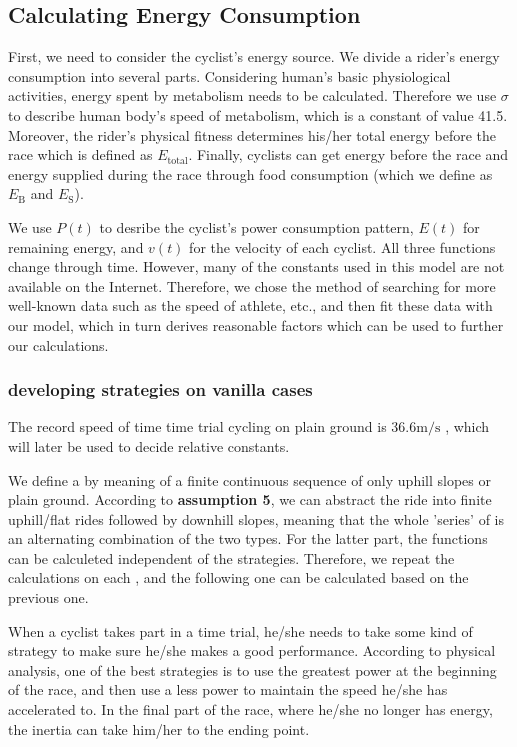 \documentclass{article}
\begin{document}
		\subsection{Calculating Energy Consumption}
			First, we need to consider the cyclist's energy source. We divide a rider's energy consumption into several parts. Considering human's basic physiological activities, energy spent by metabolism needs to be calculated. Therefore we use $\sigma$ to describe human body's speed of metabolism, which is a constant of value 41.5. Moreover, the rider's physical fitness determines his/her total energy before the race which is defined as $ E _\mathrm{total}$. Finally, cyclists can get energy before the race and energy supplied during the race through food consumption (which we define as $ E _\mathrm{B}$ and $ E _\mathrm{S}$).

			We use $P(t)$ to desribe the cyclist's power consumption pattern, $E(t)$ for remaining energy, and $v(t)$ for the velocity of each cyclist. All three functions change through time. However, many of the constants used in this model are not available on the Internet. Therefore, we chose the method of searching for more well-known data such as the speed of athlete, etc., and then fit these data with our model, which in turn derives reasonable factors which can be used to further our calculations.

			\subsubsection{developing strategies on vanilla cases}
			The record speed of time time trial cycling on plain ground is 36.6$\mathrm{m/s}$ \cite{time trial record}, which will later be used to decide relative constants.

			We define a  by meaning of a finite continuous sequence of only uphill slopes or plain ground. According to \textbf{assumption 5}, we can abstract the ride into finite uphill/flat rides followed by downhill slopes, meaning that the whole 'series' of  is an alternating combination of the two types. For the latter part, the functions can be calculeted independent of the strategies. Therefore, we repeat the calculations on each , and the following one can be calculated based on the previous one.

			When a cyclist takes part in a time trial, he/she needs to take some kind of strategy to make sure he/she makes a good performance. According to physical analysis, one of the best strategies is to use the greatest power at the beginning of the race, and then use a less power to maintain the speed he/she has accelerated to. In the final part of the race, where he/she no longer has energy, the inertia can take him/her to the ending point.
\end{document}
